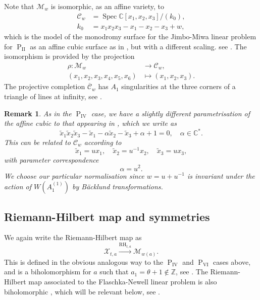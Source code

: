 \documentclass[a4paper,reqno]{amsart}
\numberwithin{equation}{section}
\newcommand{\Z}{\mathbb{Z}}
\newcommand{\C}{\mathbb{C}}
\newcommand{\pain}[1]{\operatorname{P}_{\mathrm{#1}}}
\newtheorem{remark}[theorem]{Remark}
\numberwithin{equation}{section}
\begin{document}
Note that $\mathcal{M}_w$ is isomorphic, as an affine variety, to
\begin{equation*}
    \begin{aligned}
        \mathcal{C}_w &= \operatorname{Spec}\C[x_1,x_2,x_3]/(k_0),\\
        k_0&=x_1 x_2 x_3 - x_1 -x_2 -x_3  + w,
    \end{aligned}
\end{equation*}
which is the model of the monodromy surface for the Jimbo-Miwa linear problem for $\pain{II}$ as an affine cubic surface as in \cites{putsaito,chekhovdecorated}, but with a different scaling. see . 
The isomorphism is provided by the projection 
\begin{equation} \label{eq:MwtocubicPII}
    \begin{aligned}
    \rho : \mathcal{M}_w &\rightarrow \mathcal{C}_w,\\
    \left(x_1,x_2,x_3,x_4,x_5,x_6\right) &\mapsto \left(x_1,x_2,x_3\right).
    \end{aligned}
\end{equation}
The projective completion $\overline{\mathcal{C}}_w$ has $A_1$ singularities at the three corners of a triangle of lines at infinity, see \cite[Table 4]{JMR}.

\begin{remark} \label{rem:reltovdPScubicPII}
    As in the $\pain{IV}$ case, we have a slightly different parametrisation of the affine cubic to that appearing in \cite{putsaito}, which we write as 
    \begin{equation*}
        \tilde{x}_1\tilde{x}_2\tilde{x}_3-\tilde{x}_1-\alpha  \tilde{x}_2 - \tilde{x}_3 + \alpha+1=0, \quad \alpha\in\C^*.
    \end{equation*}
    This can be related to $\mathcal{C}_w$ according to 
    $$ \tilde{x}_1=u x_1, \quad \tilde{x}_2= u^{-1} x_2, \quad \tilde{x}_3= u x_3,$$
    with parameter correspondence
    $$\alpha= u^2.$$
    We choose our particular normalisation since $w = u+u^{-1}$ is invariant under the action of ${W}(A_1^{(1)})$ by B\"acklund transformations.
    
\end{remark}


\subsection{Riemann-Hilbert map and symmetries}

We again write the Riemann-Hilbert map as 
\begin{equation*}
    \mathcal{X}_{t,a} \xrightarrow{\operatorname{RH}_{t,a}} \mathcal{M}_{w(a)}.
\end{equation*}
This is defined in the obvious analogous way to the $\pain{IV}$ and $\pain{VI}$ cases above, and is a biholomorphism for $a$ such that $a_1=\theta+1 \notin \Z$, see \cites{fokas,putsaito}.
The Riemann-Hilbert map associated to the Flaschka-Newell linear problem is also biholomorphic \cites{flaschkanewell,fokas, putsaito}, which will be relevant below, see .
\end{document}
